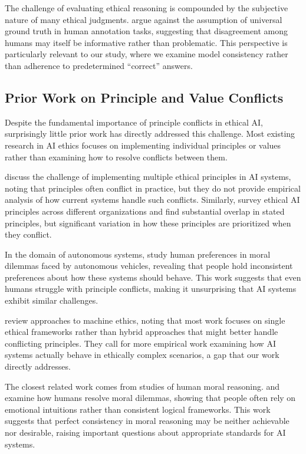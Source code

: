 \documentclass[11pt,a4paper]{article}
\begin{document}
The challenge of evaluating ethical reasoning is compounded by the subjective nature of many ethical judgments. \citet{aroyo2015truth} argue against the assumption of universal ground truth in human annotation tasks, suggesting that disagreement among humans may itself be informative rather than problematic. This perspective is particularly relevant to our study, where we examine model consistency rather than adherence to predetermined ``correct'' answers.

\subsection{Prior Work on Principle and Value Conflicts}

Despite the fundamental importance of principle conflicts in ethical AI, surprisingly little prior work has directly addressed this challenge. Most existing research in AI ethics focuses on implementing individual principles or values rather than examining how to resolve conflicts between them.

\citet{floridi2019translating} discuss the challenge of implementing multiple ethical principles in AI systems, noting that principles often conflict in practice, but they do not provide empirical analysis of how current systems handle such conflicts. Similarly, \citet{jobin2019global} survey ethical AI principles across different organizations and find substantial overlap in stated principles, but significant variation in how these principles are prioritized when they conflict.

In the domain of autonomous systems, \citet{bonnefon2016social} study human preferences in moral dilemmas faced by autonomous vehicles, revealing that people hold inconsistent preferences about how these systems should behave. This work suggests that even humans struggle with principle conflicts, making it unsurprising that AI systems exhibit similar challenges.

\citet{winfield2021review} review approaches to machine ethics, noting that most work focuses on single ethical frameworks rather than hybrid approaches that might better handle conflicting principles. They call for more empirical work examining how AI systems actually behave in ethically complex scenarios, a gap that our work directly addresses.

The closest related work comes from studies of human moral reasoning. \citet{greene2001emotional} and \citet{haidt2001emotional} examine how humans resolve moral dilemmas, showing that people often rely on emotional intuitions rather than consistent logical frameworks. This work suggests that perfect consistency in moral reasoning may be neither achievable nor desirable, raising important questions about appropriate standards for AI systems.
\end{document}
